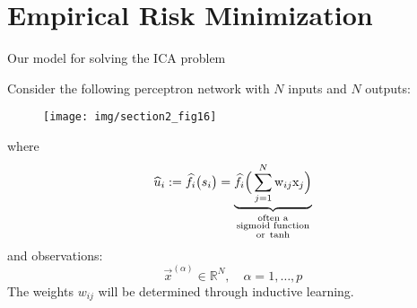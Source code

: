 \section{Empirical Risk Minimization}


\begin{frame}{Our model for solving the ICA problem}

Consider the following perceptron network with $N$ inputs and $N$ outputs:
\begin{figure}[ht]
\centering
\texttt{[image: img/section2\_fig16]}
\end{figure}
where
\svspace{-4mm}
\begin{equation}
\widehat{u}_i := \widehat{f}_i 
	\big( 
		s_i 
	\big) = \underbrace{
	\widehat{f}_i 
	\Big( \sum_{j=1}^{N} \mathrm{w}_{ij} 
		\mathrm{x}_j 
	\Big) }_{
	\substack{
		\text{often a} \\
		\text{sigmoid function}\\
		\text{or\;} \tanh}
	}
\end{equation}
and observations:
\svspace{-4mm}
\begin{equation}
\vec{x}^{(\alpha)} \in \mathbb{R}^N, 
		\quad \alpha = 1, \ldots, p
\end{equation}
The weights $w_{ij}$ will be determined through inductive learning.

\end{frame}

